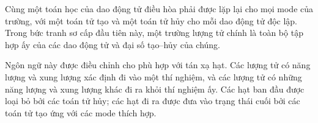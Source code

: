 Cùng một toán học của dao động tử điều hòa phải được lặp lại cho mọi mode của trường, với một toán tử tạo và một toán tử hủy cho mỗi dao động tử độc lập. Trong bức tranh sơ cấp đầu tiên này, một trường lượng tử chính là toàn bộ tập hợp ấy của các dao động tử và đại số tạo--hủy của chúng.

Ngôn ngữ này được điều chỉnh cho phù hợp với tán xạ hạt. Các lượng tử có năng lượng và xung lượng xác định đi vào một thí nghiệm, và các lượng tử có những năng lượng và xung lượng khác đi ra khỏi thí nghiệm ấy. Các hạt ban đầu được loại bỏ bởi các toán tử hủy; các hạt đi ra được đưa vào trạng thái cuối bởi các toán tử tạo ứng với các mode thích hợp.

\begin{classroomqa}
\end{classroomqa}
